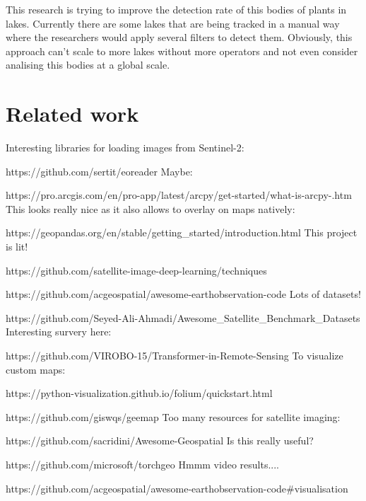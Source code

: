 \documentclass[notitlepage]{report}
\begin{document}
    This research is trying to improve the detection rate of this bodies of plants in lakes. 
    Currently there are some lakes that are being tracked in a manual way where the researchers 
    would apply several filters to detect them. Obviously, this approach can't scale to more lakes
    without more operators and not even consider analising this bodies at a global scale.


    \section*{Related work}
    Interesting libraries for loading images from Sentinel-2:

    https://github.com/sertit/eoreader
    \newline
    Maybe:

    https://pro.arcgis.com/en/pro-app/latest/arcpy/get-started/what-is-arcpy-.htm
    \newline
    This looks really nice as it also allows to overlay on maps natively:

    https://geopandas.org/en/stable/getting\_started/introduction.html
    \newline
    This project is lit!

    https://github.com/satellite-image-deep-learning/techniques

    https://github.com/acgeospatial/awesome-earthobservation-code
    \newline
    Lots of datasets!

    https://github.com/Seyed-Ali-Ahmadi/Awesome\_Satellite\_Benchmark\_Datasets
    \newline
    Interesting survery here:

    https://github.com/VIROBO-15/Transformer-in-Remote-Sensing
    \newline
    To visualize custom maps:

    https://python-visualization.github.io/folium/quickstart.html

    https://github.com/giswqs/geemap
    \newline
    Too many resources for satellite imaging:

    https://github.com/sacridini/Awesome-Geospatial
    \newline
    Is this really useful?

    https://github.com/microsoft/torchgeo
    \newline
    Hmmm video results....

    https://github.com/acgeospatial/awesome-earthobservation-code#visualisation
\end{document}
